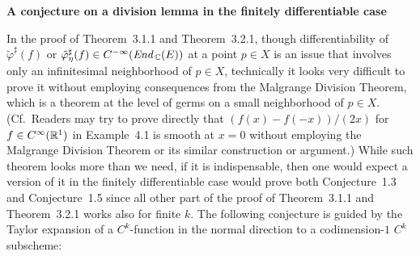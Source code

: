 \documentclass[11pt]{article}
\numberwithin{equation}{subsection}
\newcommand{\End}{\mbox{\it End}\,}
\begin{document}
\bigskip

\begin{flushleft}
{\bf A conjecture on a division lemma in the finitely differentiable case}
\end{flushleft}
%
In the proof of Theorem~3.1.1 and Theorem~3.2.1,
though differentiability of
   $\tilde{\varphi}^{\sharp}(f)$ or
   $\tilde{\varphi}_{\eta}^{\sharp}(f)\in C^{-\infty}(\End_{\Bbb C}(E))$
  at a point $p\in X$
  is an issue that involves only an infinitesimal neighborhood of $p\in X$,
 technically it looks very difficult to prove it without employing consequences
  from the Malgrange Division Theorem,
  which is a theorem at the level of germs on a small neighborhood of $p\in X$.
(Cf.\ Readers may try to prove directly that
      $(f(x)-f(-x))/(2x)$ for $f\in C^{\infty}({\Bbb R}^1)$
  	  in Example~4.1 is smooth at $x=0$
	  without employing the Malgrange Division Theorem or its similar construction or argument.)
While such theorem looks more than we need,
 if it is indispensable, then one would expect  a version of it in the finitely differentiable case
 would prove both Conjecture~1.3 and Conjecture~1.5
  since all other part of the proof of Theorem~3.1.1 and Theorem~3.2.1 works also for finite $k$.
The following conjecture is guided by the Taylor expansion of a $C^k$-function
  in the normal direction to a codimension-$1$ $C^k$ subscheme:

\bigskip
\end{document}
